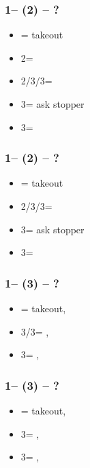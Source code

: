 \documentclass[12pt, a4paper]{report}
\begin{document}
\subsubsection*{1\clubs -- (2\hearts) -- ?}
\begin{itemize}
    \item \dbl = takeout
    \item 2\spades = \nat\ \nf
    \item 2\nt/3\clubs/3\hearts = \trsf{\clubs/\diams/\spades}\ \invp
    \item 3\diams = ask stopper
    \item 3\spades = \minor
\end{itemize}

\subsubsection*{1\clubs -- (2\spades) -- ?}
\begin{itemize}
    \item \dbl = takeout
    \item 2\nt/3\clubs/3\diams = \trsf{\clubs/\diams/\hearts}\ \invp
    \item 3\hearts = ask stopper
    \item 3\spades = \minor
\end{itemize}

\subsubsection*{1\clubs -- (3\clubs) -- ?}
\begin{itemize}
    \item \dbl = takeout, \gf
    \item 3\diams/3\hearts = \trsf{\hearts/\spades}, \invp
    \item 3\spades = \trsf{\diams}, \gf
\end{itemize}

\subsubsection*{1\clubs -- (3\diams) -- ?}
\begin{itemize}
    \item \dbl = takeout, \gf
    \item 3\hearts = \trsf{\spades}, \invp
    \item 3\spades = \trsf{\hearts}, \gf
\end{itemize}
\end{document}
